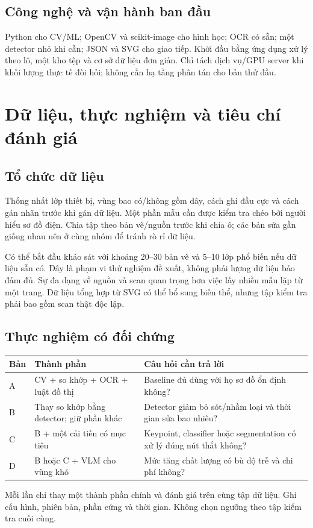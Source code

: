 \documentclass[11pt,a4paper]{article}
\begin{document}
\subsection{Công nghệ và vận hành ban đầu}
Python cho CV/ML; OpenCV và scikit-image cho hình học; OCR có sẵn; một detector nhỏ khi cần; JSON và SVG cho giao tiếp. Khởi đầu bằng ứng dụng xử lý theo lô, một kho tệp và cơ sở dữ liệu đơn giản. Chỉ tách dịch vụ/GPU server khi khối lượng thực tế đòi hỏi; không cần hạ tầng phân tán cho bản thử đầu.

\clearpage
\section{Dữ liệu, thực nghiệm và tiêu chí đánh giá}
\subsection{Tổ chức dữ liệu}
Thống nhất lớp thiết bị, vùng bao có/không gồm dây, cách ghi đầu cực và cách gán nhãn trước khi gán dữ liệu. Một phần mẫu cần được kiểm tra chéo bởi người hiểu sơ đồ điện. Chia tập theo bản vẽ/nguồn trước khi chia ô; các bản sửa gần giống nhau nên ở cùng nhóm để tránh rò rỉ dữ liệu.

Có thể bắt đầu khảo sát với khoảng 20--30 bản vẽ và 5--10 lớp phổ biến nếu dữ liệu sẵn có. Đây là phạm vi thử nghiệm đề xuất, không phải lượng dữ liệu bảo đảm đủ. Sự đa dạng về nguồn và scan quan trọng hơn việc lấy nhiều mẫu lặp từ một trang. Dữ liệu tổng hợp từ SVG có thể bổ sung biến thể, nhưng tập kiểm tra phải bao gồm scan thật độc lập.

\subsection{Thực nghiệm có đối chứng}
\begin{tabularx}{\linewidth}{@{}p{12mm}Y Y@{}}
\toprule
\textbf{Bản} & \textbf{Thành phần} & \textbf{Câu hỏi cần trả lời}\\\midrule
A & CV + so khớp + OCR + luật đồ thị & Baseline đủ dùng với họ sơ đồ ổn định không?\\
B & Thay so khớp bằng detector; giữ phần khác & Detector giảm bỏ sót/nhầm loại và thời gian sửa bao nhiêu?\\
C & B + một cải tiến có mục tiêu & Keypoint, classifier hoặc segmentation có xử lý đúng nút thắt không?\\
D & B hoặc C + VLM cho vùng khó & Mức tăng chất lượng có bù độ trễ và chi phí không?\\\bottomrule
\end{tabularx}
Mỗi lần chỉ thay một thành phần chính và đánh giá trên cùng tập dữ liệu. Ghi cấu hình, phiên bản, phần cứng và thời gian. Không chọn ngưỡng theo tập kiểm tra cuối cùng.
\end{document}
